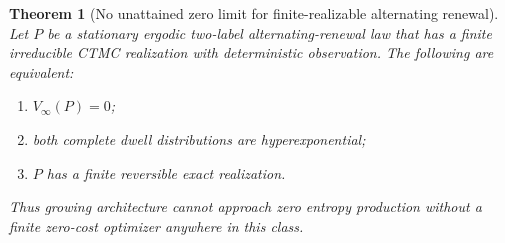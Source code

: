 \documentclass[11pt,a4paper]{article}
\newtheorem{theorem}{Theorem}
\begin{document}
\begin{theorem}[No unattained zero limit for finite-realizable alternating renewal]\label{thm:dichotomy}
Let $P$ be a stationary ergodic two-label alternating-renewal law that has a finite irreducible CTMC realization with deterministic observation. The following are equivalent:
\begin{enumerate}[label=(\roman*),itemsep=0pt]
\item $V_\infty(P)=0$;
\item both complete dwell distributions are hyperexponential;
\item $P$ has a finite reversible exact realization.
\end{enumerate}
Thus growing architecture cannot approach zero entropy production without a finite zero-cost optimizer anywhere in this class.
\end{theorem}
\end{document}
